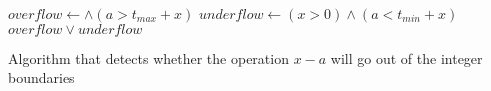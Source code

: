 \begin{algorithm}[H]
    \begin{algorithmic}
            \State $overflow \gets$$ \wedge (a > t_{max} + x)$
            \State $underflow \gets (x > 0) \wedge (a < t_{min} + x)$
            \State \Return $overflow \vee underflow$
        \EndFunction
    \end{algorithmic}
    \caption{Algorithm that detects whether the operation $x - a$ will go out of the integer boundaries}
    \label{alg:basics:overflow:detect}
\end{algorithm}